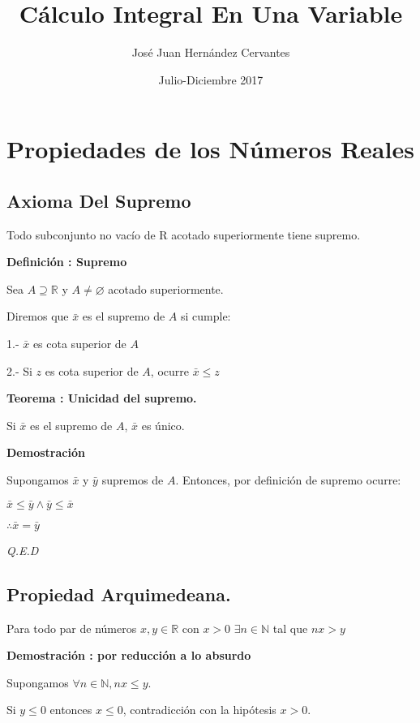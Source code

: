 \documentclass{book}
\title{Cálculo Integral En Una Variable}
\author{José Juan Hernández Cervantes}
\date{Julio-Diciembre 2017}
\begin{document}
\maketitle
\chapter{Propiedades de los Números Reales}
\section{Axioma Del Supremo}

Todo subconjunto no vacío de R acotado superiormente tiene supremo.

\textbf{Definición : Supremo}


Sea $A \supseteq \mathbb{R}$ y $A \neq \varnothing$ acotado superiormente.

Diremos que $\bar{x}$  es el supremo de $A$ si cumple:

1.- $\bar{x}$  es cota superior de $A$


2.- Si $z$ es cota superior de $A$, ocurre $\bar{x}\le z$


\textbf{Teorema : Unicidad del supremo.}


Si $\bar{x}$ es el supremo de $A$, $\bar{x}$ es único.

\textbf{Demostración}


Supongamos $\bar{x}$ y $\bar{y}$ supremos de
$A$. Entonces, por definición de supremo ocurre:

$\bar{x}\le\bar{y}\land\bar{y}\le\bar{x}$

$\therefore \bar{x}=\bar{y}$

\textit{Q.E.D}


\section{Propiedad Arquimedeana.}

Para todo par de números $x,y\in \mathbb{R}$ con $x> 0$ $\exists n\in\mathbb{N}$ tal que $nx> y$


\textbf{Demostración : por reducción a lo absurdo}


Supongamos $\forall{n}\in\mathbb{N},nx\le{y}$.

Si $y\le{0}$ entonces $x\le{0}$, contradicción con la hipótesis $x>0$.
\end{document}
